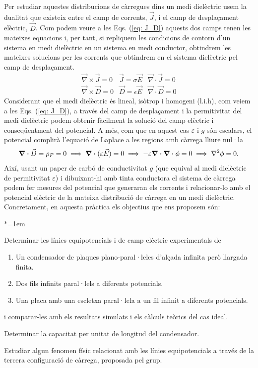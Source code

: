 \documentclass[11pt]{article}
\numberwithin{equation}{section}
\numberwithin{figure}{section}
\numberwithin{table}{section}
\begin{document}
Per estudiar aquestes distribucions de càrregues dins un medi dielèctric usem la dualitat que existeix entre el camp de corrents, $\vec{J}$, i el camp de desplaçament elèctric, $\vec{D}$. Com podem veure a les Eqs. (\ref{eq: J_D}) aquests dos camps tenen les mateixes equacions i, per tant, si repliquem les condicions de contorn d'un sistema en medi dielèctric en un sistema en medi conductor, obtindrem les mateixes solucions per les corrents que obtindrem en el sistema dielèctric pel camp de desplaçament.
\begin{equation}
    \begin{array}{lll}
    \vec{\nabla} \times \vec{J}=0 & \vec{J}=\sigma \vec{E} & \vec{\nabla} \cdot \vec{J}=0 \\
    \vec{\nabla} \times \vec{D}=0 & \vec{D}=\epsilon \vec{E} & \vec{\nabla} \cdot \vec{D}=0
    \end{array}
    \label{eq: J_D}
\end{equation}
Considerant que el medi dielèctric és lineal, isòtrop i homogeni (l.i.h), com veiem a les Eqs. (\ref{eq: J_D}), a través del camp de desplaçament i la permitivitat del medi dielèctric podem obtenir fàcilment la solució del camp elèctric i conseqüentment del potencial. A més, com que en aquest cas $\varepsilon$ i $g$ són escalars, el potencial complirà l'equació de Laplace a les regions amb càrrega lliure nul·la
\begin{equation}
    \div{\vec{D}}=\rho_F=0 \implies \div{(\varepsilon\vec{E})}=0\implies-\varepsilon\div{\div{\phi}}=0\implies\laplacian{\phi}=0.
\end{equation}
Així, usant un paper de carbó de conductivitat $g$ (que equival al medi dielèctric de permitivitat $\varepsilon$) i dibuixant-hi amb tinta conductora el sistema de càrrega podem fer mesures del potencial que generaran els corrents i relacionar-lo amb el potencial elèctric de la mateixa distribució de càrrega en un medi dielèctric.
Concretament, en aquesta pràctica els objectius que ens proposem són:
\begin{list}{$\ast$}{\leftmargin=1em}
    \item Determinar les línies equipotencials i de camp elèctric experimentals de
        \begin{enumerate}{\leftmargin=1em}
            \item  Un condensador de plaques plano-paral·leles d'alçada infinita però llargada finita.
            \item  Dos fils infinits paral·lels a diferents potencials.
            \item  Una placa amb una escletxa paral·lela a un fil infinit a diferents potencials.
        \end{enumerate}  
        i comparar-les amb els resultats simulats i els càlculs teòrics del cas ideal.
    \item Determinar la capacitat per unitat de longitud del condensador.
    \item Estudiar algun fenomen físic relacionat amb les línies equipotencials a través de la tercera configuració de càrrega, proposada pel grup.
\end{list}
\end{document}
